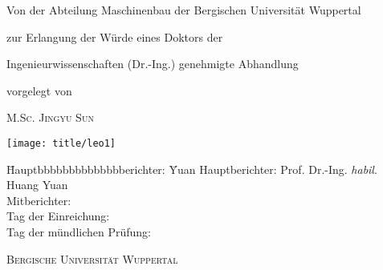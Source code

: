 %

\begin{titlepage}                  %
\renewcommand{\baselinestretch}{1.0}
\begin{center}

    {\bf\huge{} \par}
    {\bf\huge{} \par}
    {\bf\huge{} \par}
\vspace*{15mm}

    {{Von der Abteilung Maschinenbau der Bergischen Universit\"{a}t Wuppertal \par}}
\vspace*{2mm}
    {{zur Erlangung der W\"{u}rde eines Doktors der \par}}
\vspace*{2mm}
    {{Ingenieurwissenschaften (Dr.-Ing.) genehmigte Abhandlung \par}}


\vspace*{10mm}

    {{vorgelegt von} \par}
\vspace*{2mm}
    {{\large\scshape M.Sc. Jingyu Sun} \par}

\vspace*{2mm}

\vspace*{28mm}
\texttt{[image: title/leo1]}
\vspace*{10mm}

{
\begin{tabbing}
\hspace*{23mm}
\=Hauptbbbbbbbbbbbbbberichter: \=Yuan\kill
\>Hauptberichter: \>Prof. Dr.-Ing. \emph{habil}. Huang Yuan\\
\>Mitberichter: \>\\
\>Tag der Einreichung:\>\\
\>Tag der m\"{u}ndlichen Pr\"{u}fung:\>\\
\end{tabbing}
}

\vspace*{10mm}
  {{\large\scshape Bergische Universit\"at Wuppertal}}



\end{center}

\end{titlepage}
